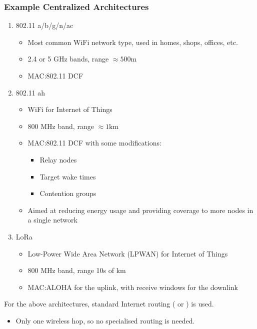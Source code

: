 \subsubsection{Example Centralized Architectures}\label{subsubsec:Centralized_Architectures}
\begin{enumerate}[noitemsep]
\item 802.11 a/b/g/n/ac
\begin{itemize}[noitemsep]
\item Most common WiFi network type, used in homes, shops, offices, etc.
\item 2.4 or 5 GHz bands, range $\approx 500 \si{\meter}$
\item MAC:\@ 802.11 DCF
\end{itemize}

\item 802.11 ah
  \begin{itemize}[noitemsep]
  \item WiFi for Internet of Things
  \item 800 MHz band, range $\approx 1 \si{\kilo \meter}$
  \item MAC:\@ 802.11 DCF with some modifications:
    \begin{itemize}[noitemsep]
    \item Relay nodes
    \item Target wake times
    \item Contention groups
    \end{itemize}
  \item Aimed at reducing energy usage and providing coverage to more nodes in a single network
\end{itemize}

\item LoRa
  \begin{itemize}[noitemsep]
  \item Low-Power Wide Area Network (LPWAN) for Internet of Things
  \item 800 MHz band, range 10s of km
  \item MAC:\@ ALOHA for the uplink, with receive windows for the downlink
  \end{itemize}
\end{enumerate}

\begin{remark*}
  For the above architectures, standard Internet routing ( or ) is used.
  \begin{itemize}[noitemsep]
  \item Only one wireless hop, so no specialised routing is needed.
  \end{itemize}
\end{remark*}

